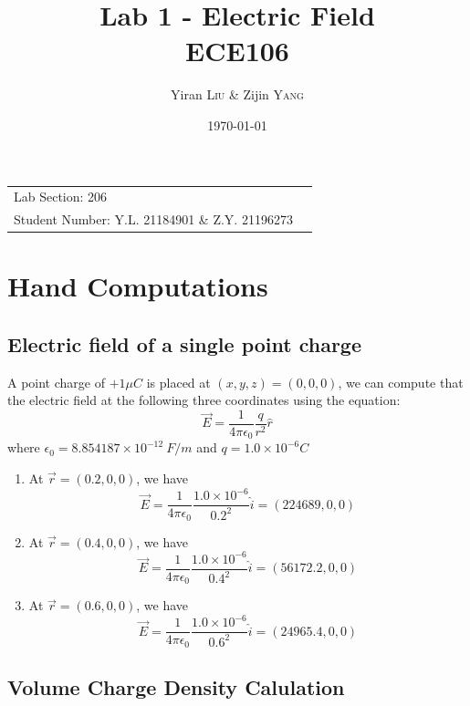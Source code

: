 \documentclass[
	letterpaper, %
	11pt, %
]{CSUniSchoolLabReport}
\title{Lab 1 - Electric Field  \\ ECE106} %
\author{Yiran \textsc{Liu} \&  Zijin \textsc{Yang}} %
\date{\today} %
\begin{document}
\maketitle %

\begin{center}
	\begin{tabular}{l r}
      Lab Section: 206 \\
      Student Number: Y.L. 21184901 \& Z.Y. 21196273
	\end{tabular}
\end{center}

\section{Hand Computations}

\subsection{Electric field of a single point charge}

A point charge of $+1\mu C$ is placed at $(x, y, z) = (0, 0, 0)$, we can compute that the electric field at the following three coordinates using the equation:
\[
  \vec{E} = \frac{1}{4\pi\epsilon_{0}} \frac{q}{r^2}\hat{r}
\]
where $\epsilon_{0} = 8.854187 \times 10^{-12} \ F / m$ and $q = 1.0 \times 10^{-6} C$

\begin{enumerate}
  \item At $\vec{r} = (0.2, 0, 0)$, we have 
    \[
      \vec{E} = \frac{1}{4 \pi \epsilon_{0}} \frac{1.0 \times 10^{-6}}{0.2^2} \hat{i} = (224689, 0, 0)
    \]
  \item At $\vec{r} = (0.4, 0, 0)$, we have 
    \[
      \vec{E} = \frac{1}{4 \pi \epsilon_{0}} \frac{1.0 \times 10^{-6}}{0.4^2} \hat{i} = (56172.2, 0, 0)
    \]
  \item At $\vec{r} = (0.6, 0, 0)$, we have 
    \[
      \vec{E} = \frac{1}{4 \pi \epsilon_{0}} \frac{1.0 \times 10^{-6}}{0.6^2} \hat{i} = (24965.4, 0, 0)
    \]
\end{enumerate}


\subsection{Volume Charge Density Calulation}
\end{document}
